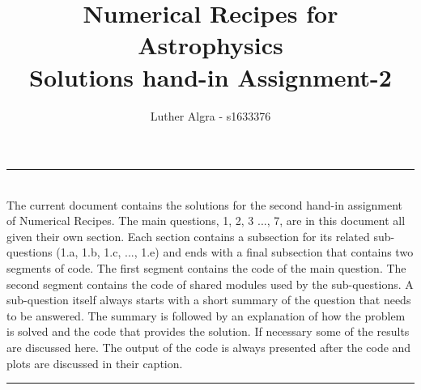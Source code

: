 \documentclass[a4paper,10pt]{article}
\title{\vspace{-1cm}\textbf{Numerical Recipes for Astrophysics \\ Solutions hand-in Assignment-2}}
\author{Luther Algra - s1633376}
\renewenvironment{abstract}
 { \vspace*{0.3cm} \textbf{\abstractname} \vspace{0.1cm} \\ \ignorespaces}
 {\par\medskip \vspace{0.1cm}}
\begin{document}
\maketitle
\hrule
\begin{abstract}
The current document contains the solutions for the second hand-in assignment of Numerical Recipes. The main questions, 1, 2, 3 ..., 7, are in this document all given their own section. Each section contains a subsection for its related sub-questions (1.a, 1.b, 1.c, ..., 1.e) and ends with a final subsection that contains two segments of code. The first segment contains the code of the main question. The second segment contains the code of shared modules used by the sub-questions. A sub-question itself always starts with a short summary of the question that needs to be answered. The summary is followed by an explanation of how the problem is solved and the code that provides the solution. If necessary some of the results are discussed here. The output of the code is always presented after the code and plots are discussed in their caption.


\end{abstract}
\hrule
\vspace{0.5cm}





























%


%





  
\end{document}
